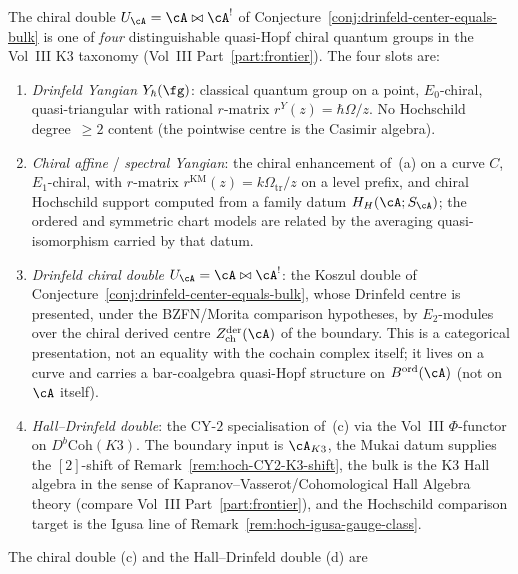 \begin{remark}
\label{rem:hoch-hall-drinfeld-fourth-slot}
%
%
%
The chiral double $U_\cA=\cA\bowtie\cA^!$ of
Conjecture~\ref{conj:drinfeld-center-equals-bulk} is one of
\emph{four} distinguishable quasi-Hopf chiral quantum groups in the
Vol~III K3 taxonomy (Vol~III Part~\ref{part:frontier}). The
four slots are:
\begin{enumerate}[label=\textup{(\alph*)}]
\item \emph{Drinfeld Yangian} $Y_\hbar(\fg)$: classical quantum
 group on a point, $E_0$-chiral, quasi-triangular with rational
 $r$-matrix $r^Y(z)=\hbar\Omega/z$. No Hochschild degree~$\geq 2$
 content (the pointwise centre is the Casimir algebra).
\item \emph{Chiral affine} / \emph{spectral Yangian}: the chiral
 enhancement of~(a) on a curve $C$, $E_1$-chiral, with
 $r$-matrix $r^{\mathrm{KM}}(z)=k\Omega_{\mathrm{tr}}/z$ on a level prefix, and
 chiral Hochschild support computed from a family datum
 $H_H(\cA;S_\cA)$; the ordered and symmetric chart models are related
 by the averaging quasi-isomorphism carried by that datum.
\item \emph{Drinfeld chiral double} $U_\cA=\cA\bowtie\cA^!$: the
Koszul double of Conjecture~\ref{conj:drinfeld-center-equals-bulk},
whose Drinfeld centre is presented, under the BZFN/Morita comparison
hypotheses, by \(E_2\)-modules over the chiral derived centre
$Z^{\mathrm{der}}_{\mathrm{ch}}(\cA)$ of the boundary. This is a
categorical presentation, not an equality with the cochain complex
itself; it lives on a curve and carries a bar-coalgebra quasi-Hopf
structure on $B^{\mathrm{ord}}(\cA)$ (not on $\cA$ itself).
\item \emph{Hall--Drinfeld double}: the CY-$2$ specialisation of~(c)
 via the Vol~III $\Phi$-functor on $D^b\mathrm{Coh}(K3)$. The
 boundary input is $\cA_{K3}$, the Mukai datum supplies the
 $[2]$-shift of Remark~\ref{rem:hoch-CY2-K3-shift}, the bulk
is the K3 Hall algebra in the sense of
Kapranov--Vasserot/Cohomological Hall Algebra theory
(compare Vol~III Part~\ref{part:frontier}), and the
Hochschild comparison target is the Igusa line of
Remark~\ref{rem:hoch-igusa-gauge-class}.
\end{enumerate}
The chiral double (c) and the Hall--Drinfeld double (d) are

\end{remark}
